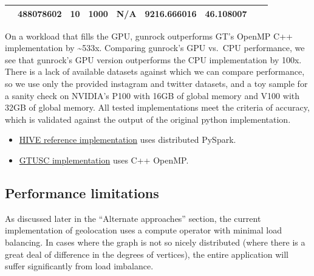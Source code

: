 \documentclass[10pt,oneside]{memoir}
\providecommand{\tightlist}{%
  \setlength{\itemsep}{0pt}\setlength{\parskip}{0pt}}
\begin{document}
\begin{longtable}[]{@{}lllllllll@{}}
\begin{minipage}[t]{0.06\columnwidth}
\end{minipage} & \begin{minipage}[t]{0.07\columnwidth}\raggedright
488078602\strut
\end{minipage} & \begin{minipage}[t]{0.07\columnwidth}\raggedright
10\strut
\end{minipage} & \begin{minipage}[t]{0.09\columnwidth}\raggedright
1000\strut
\end{minipage} & \begin{minipage}[t]{0.12\columnwidth}\raggedright
N/A\strut
\end{minipage} & \begin{minipage}[t]{0.10\columnwidth}\raggedright
9216.666016\strut
\end{minipage} & \begin{minipage}[t]{0.09\columnwidth}\raggedright
46.108007\strut
\end{minipage}\tabularnewline
\bottomrule
\end{longtable}

On a workload that fills the GPU, gunrock outperforms GT's OpenMP C++
implementation by \textasciitilde{}533x. Comparing gunrock's GPU vs.~CPU
performance, we see that gunrock's GPU version outperforms the CPU
implementation by 100x. There is a lack of available datasets against
which we can compare performance, so we use only the provided instagram
and twitter datasets, and a toy sample for a sanity check on NVIDIA's
P100 with 16GB of global memory and V100 with 32GB of global memory. All
tested implementations meet the criteria of accuracy, which is validated
against the output of the original python implementation.

\begin{itemize}
\tightlist
\item
  \href{https://gitlab.hiveprogram.com/ggillary/geotagging.git}{HIVE
  reference implementation} uses distributed PySpark.
\item
  \href{https://gitlab.hiveprogram.com/gtusc/geotagging}{GTUSC
  implementation} uses C++ OpenMP.
\end{itemize}

\hypertarget{performance-limitations-1}{%
\subsection{Performance limitations}\label{performance-limitations-1}}

As discussed later in the ``Alternate approaches'' section, the current
implementation of geolocation uses a compute operator with minimal load
balancing. In cases where the graph is not so nicely distributed (where
there is a great deal of difference in the degrees of vertices), the
entire application will suffer significantly from load imbalance.
\end{document}
